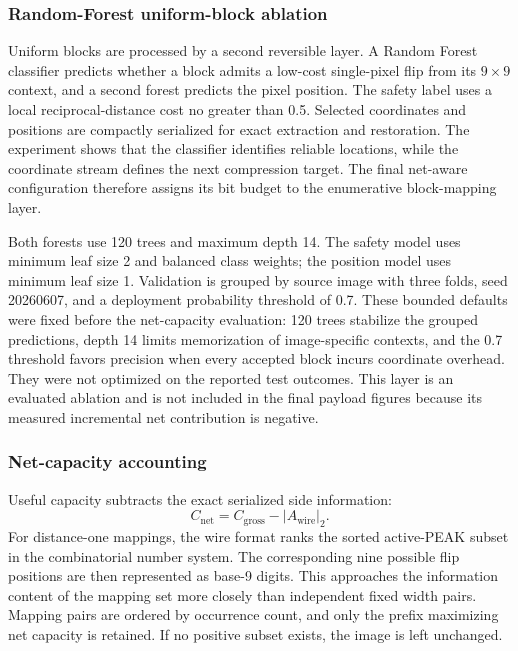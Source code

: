 \documentclass[a4paper,fleqn]{cas-dc}
\begin{document}
\subsubsection*{Random-Forest uniform-block ablation}
\label{subsec:rf-layer}

Uniform blocks are processed by a second reversible layer. A Random Forest
classifier predicts whether a block admits a low-cost single-pixel flip from
its $9\times9$ context, and a second forest predicts the pixel position. The
safety label uses a local reciprocal-distance cost no greater than 0.5.
Selected coordinates and positions are compactly serialized for exact
extraction and restoration. The experiment shows that the classifier
identifies reliable locations, while the coordinate stream defines the next
compression target. The final net-aware configuration therefore assigns its
bit budget to the enumerative block-mapping layer.

Both forests use 120 trees and maximum depth 14. The safety model uses
minimum leaf size 2 and balanced class weights; the position model uses
minimum leaf size 1. Validation is grouped by source image with three folds,
seed 20260607, and a deployment probability threshold of 0.7. These bounded
defaults were fixed before the net-capacity evaluation: 120 trees stabilize
the grouped predictions, depth 14 limits memorization of image-specific
contexts, and the 0.7 threshold favors precision when every accepted block
incurs coordinate overhead. They were not optimized on the reported test
outcomes. This layer is an evaluated ablation and is not included in the final
payload figures because its measured incremental net contribution is negative.

\subsubsection*{Net-capacity accounting}

Useful capacity subtracts the exact serialized side information:
\[
C_{\mathrm{net}}=C_{\mathrm{gross}}-|A_{\mathrm{wire}}|_2.
\]
For distance-one mappings, the wire format ranks the sorted active-PEAK subset
in the combinatorial number system. The corresponding nine possible flip
positions are then represented as base-9 digits. This approaches the
information content of the mapping set more closely than independent fixed
width pairs. Mapping pairs are ordered by occurrence count, and only the prefix
maximizing net capacity is retained. If no positive subset exists, the image is
left unchanged.
\end{document}

